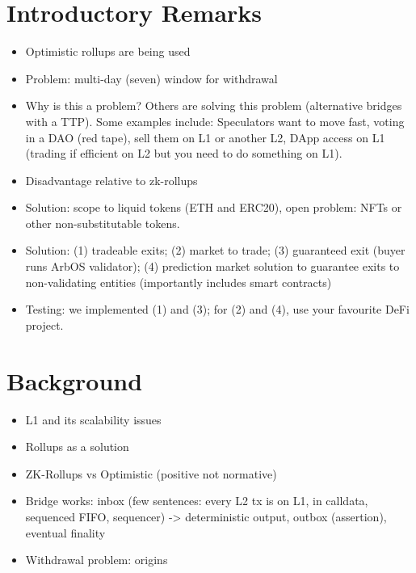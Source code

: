 \section{Introductory Remarks}

\begin{itemize}
\item Optimistic rollups are being used
\item Problem: multi-day (\eg seven) window for withdrawal
\item Why is this a problem? Others are solving this problem (alternative bridges with a TTP). Some examples include: Speculators want to move fast, voting in a DAO (red tape), sell them on L1 or another L2, DApp access on L1 (trading if efficient on L2 but you need to do something on L1). 
\item Disadvantage relative to zk-rollups
\item Solution: scope to liquid tokens (ETH and ERC20), open problem: NFTs or other non-substitutable tokens. 
\item Solution: (1) tradeable exits; (2) market to trade; (3) guaranteed exit (buyer runs ArbOS validator); (4) prediction market solution to guarantee exits to non-validating entities (importantly includes smart contracts)
\item Testing: we implemented (1) and (3); for (2) and (4), use your favourite DeFi project.
\end{itemize}

 

\section{Background} 

\begin{itemize}
\item L1 and its scalability issues
\item Rollups as a solution
\item ZK-Rollups vs Optimistic (positive not normative)
\item Bridge works: inbox (few sentences: every L2 tx is on L1, in calldata, sequenced FIFO, sequencer) -> deterministic output, outbox (assertion), eventual finality
\item Withdrawal problem: origins
\end{itemize}


